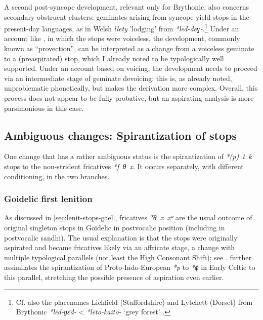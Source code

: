 \documentclass[output=paper,colorlinks,citecolor=brown]{langscibook}
\begin{document}
A second post\hyp syncope development, relevant only for Brythonic, also concerns secondary obstruent clusters:  geminates arising from syncope yield  stops in the present\hyp day languages, as in Welsh \textit{llety} 'lodging' from \textit{*led-deɣ-}.\footnote{Cf. also the placenames Lichfield (Staffordshire) and Lytchett (Dorset) from Brythonic \textit{*lēd-ɡɛ̄d-} < \textit{*lēto-kaito-} `grey forest' \parencite[563]{lheb}.} Under an account like , in which the  stops were voiceless, the development, commonly known as \enquote{provection}, can be interpreted as a change from a voiceless geminate to a (preaspirated) stop, which I already noted to be typologically well supported. Under an account based on voicing, the development needs to proceed via an intermediate stage of geminate devoicing: this is, as already noted, unproblematic phonetically, but makes the derivation more complex.  Overall, this process does not appear to be fully probative, but an aspirating analysis is more parsimonious in this case.

\subsection{Ambiguous changes: Spirantization of \texorpdfstring{}{FORTIS} stops}
\label{sec:ambiguous-changes}

One change that has a rather ambiguous status is the spirantization of  \textit{*(p)~t~k} stops to the  non\hyp strident fricatives \textit{*f~θ~x}. It occurs separately, with different conditioning, in the two branches.

\subsubsection{Goidelic first lenition}
\label{sec:first-lenit-goid}
\label{sec:spir-fort-stops}

As discussed in \cref{sec:lenit-stops-gael},  fricatives \textit{*θ~x~xʷ} are the usual outcome of original singleton  stops in Goidelic in postvocalic position (including in postvocalic sandhi). The usual explanation is that the stops were originally aspirated and became fricatives likely via an affricate stage, a change with multiple typological parallels (not least the High  Consonant Shift); see \textcite{koch90, isaac}. \textcite{Eska2018} further assimilates the spirantization of Proto\hyp Indo\hyp European \textit{*p} to \textit{*ɸ} in Early Celtic to this parallel, stretching the possible presence of aspiration even earlier.
\end{document}
